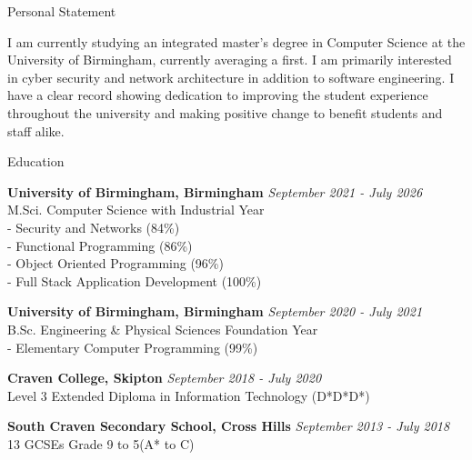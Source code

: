 \documentclass{resume} %
\begin{document}

\begin{rSection}{Personal Statement}

I am currently studying an integrated master's degree in Computer Science at the University of Birmingham, currently averaging a first. I am primarily interested in cyber security and network architecture in addition to software engineering. I have a clear record showing dedication to improving the student experience throughout the university and making positive change to benefit students and staff alike.

\end{rSection}





\begin{rSection}{Education}

{\bf University of Birmingham, Birmingham} \hfill {\em September 2021 - July 2026} \\ 
M.Sci. Computer Science with Industrial Year\\
- Security and Networks (84\%) \\
- Functional Programming (86\%)\\
- Object Oriented Programming (96\%)\\
- Full Stack Application Development (100\%)

{\bf University of Birmingham, Birmingham} \hfill {\em September 2020 - July 2021} \\ 
B.Sc. Engineering \& Physical Sciences Foundation Year\\
- Elementary Computer Programming (99\%)

{\bf Craven College, Skipton} \hfill {\em September 2018 - July 2020} \\
Level 3 Extended Diploma in Information Technology (D*D*D*)

{\bf South Craven Secondary School, Cross Hills} \hfill {\em September 2013 - July 2018} \\
13 GCSEs Grade 9 to 5(A* to C)

\end{rSection}
\end{document}
